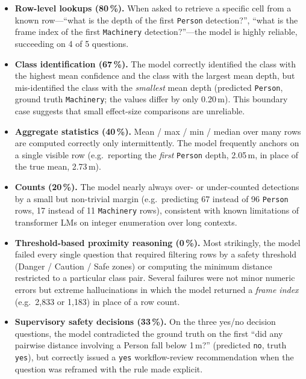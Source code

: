 \documentclass{article}
\begin{document}
\begin{itemize}
    \item \textbf{Row-level lookups (80\,\%).} When asked to retrieve a specific cell from a known row---``what is the depth of the first \texttt{Person} detection?'', ``what is the frame index of the first \texttt{Machinery} detection?''---the model is highly reliable, succeeding on 4 of 5 questions.
    \item \textbf{Class identification (67\,\%).} The model correctly identified the class with the highest mean confidence and the class with the largest mean depth, but mis-identified the class with the \emph{smallest} mean depth (predicted \texttt{Person}, ground truth \texttt{Machinery}; the values differ by only 0.20\,m). This boundary case suggests that small effect-size comparisons are unreliable.
    \item \textbf{Aggregate statistics (40\,\%).} Mean / max / min / median over many rows are computed correctly only intermittently. The model frequently anchors on a single visible row (e.g.\ reporting the \emph{first} \texttt{Person} depth, 2.05\,m, in place of the true mean, 2.73\,m).
    \item \textbf{Counts (20\,\%).} The model nearly always over- or under-counted detections by a small but non-trivial margin (e.g.\ predicting 67 instead of 96 \texttt{Person} rows, 17 instead of 11 \texttt{Machinery} rows), consistent with known limitations of transformer LMs on integer enumeration over long contexts.
    \item \textbf{Threshold-based proximity reasoning (0\,\%).} Most strikingly, the model failed every single question that required filtering rows by a safety threshold (Danger / Caution / Safe zones) or computing the minimum distance restricted to a particular class pair. Several failures were not minor numeric errors but extreme hallucinations in which the model returned a \emph{frame index} (e.g.\ 2{,}833 or 1{,}183) in place of a row count.
    \item \textbf{Supervisory safety decisions (33\,\%).} On the three yes/no decision questions, the model contradicted the ground truth on the first ``did any pairwise distance involving a Person fall below 1\,m?'' (predicted \texttt{no}, truth \texttt{yes}), but correctly issued a \texttt{yes} workflow-review recommendation when the question was reframed with the rule made explicit.
\end{itemize}
\end{document}
